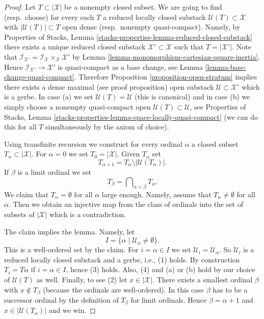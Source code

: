 \begin{proof}
Let $T \subset |\mathcal{X}|$ be a nonempty closed subset. We are going
to find (resp.\ choose) for every such $T$ a reduced locally closed substack
$\mathcal{U}(T) \subset \mathcal{X}$ with $|\mathcal{U}(T)| \subset T$
open dense (resp.\ nonempty quasi-compact). Namely, by
Properties of Stacks, Lemma
\ref{stacks-properties-lemma-reduced-closed-substack}
there exists a unique reduced closed substack
$\mathcal{X}' \subset \mathcal{X}$ such that $T = |\mathcal{X}'|$.
Note that $\mathcal{I}_{\mathcal{X}'} =
\mathcal{I}_\mathcal{X} \times_\mathcal{X} \mathcal{X}'$ by
Lemma \ref{lemma-monomorphism-cartesian-square-inertia}.
Hence $\mathcal{I}_{\mathcal{X}'} \to \mathcal{X}'$ is
quasi-compact as a base change, see
Lemma \ref{lemma-base-change-quasi-compact}.
Therefore
Proposition \ref{proposition-open-stratum}
implies there exists a dense maximal (see proof proposition)
open substack $\mathcal{U} \subset \mathcal{X}'$
which is a gerbe. In case (a) we set $\mathcal{U}(T) = \mathcal{U}$
(this is canonical) and in case (b) we simply choose a nonempty quasi-compact
open $\mathcal{U}(T) \subset \mathcal{U}$, see
Properties of Stacks, Lemma
\ref{stacks-properties-lemma-space-locally-quasi-compact}
(we can do this for all $T$
simultaneously by the axiom of choice).

\medskip\noindent
Using transfinite recursion we construct for every ordinal $\alpha$ a
closed subset $T_\alpha \subset |\mathcal{X}|$. For $\alpha = 0$
we set $T_0 = |\mathcal{X}|$. Given $T_\alpha$ set
$$
T_{\alpha + 1} = T_\alpha \setminus |\mathcal{U}(T_\alpha)|.
$$
If $\beta$ is a limit ordinal we set
$$
T_\beta = \bigcap\nolimits_{\alpha < \beta} T_\alpha.
$$
We claim that $T_\alpha = \emptyset$ for all $\alpha$
large enough. Namely, assume that $T_\alpha \not = \emptyset$
for all $\alpha$. Then we obtain an injective map from the class
of ordinals into the set of subsets of $|\mathcal{X}|$ which is a
contradiction.

\medskip\noindent
The claim implies the lemma. Namely, let
$$
I = \{\alpha \mid \mathcal{U}_\alpha \not = \emptyset \}.
$$
This is a well-ordered set by the claim. For $i = \alpha \in I$ we set
$\mathcal{U}_i = \mathcal{U}_\alpha$. So $\mathcal{U}_i$ is a reduced
locally closed substack and a gerbe, i.e., (1) holds. By construction
$T_i = T\alpha$ if $i = \alpha \in I$, hence (3) holds. Also, (4) and
(a) or (b) hold by our choice of $\mathcal{U}(T)$ as well. Finally, to see
(2) let $x \in |\mathcal{X}|$. There exists a smallest ordinal $\beta$
with $x \not \in T_\beta$ (because the ordinals are well-ordered).
In this case $\beta$ has to be a successor ordinal by the definition
of $T_\beta$ for limit ordinals. Hence $\beta = \alpha + 1$ and
$x \in |\mathcal{U}(T_\alpha)|$ and we win.
\end{proof}

